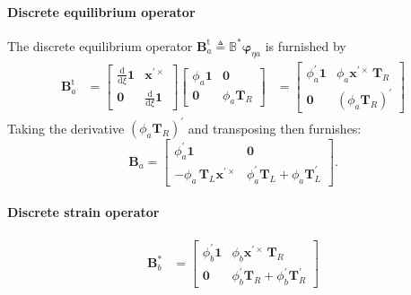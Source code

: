 \paragraph{Discrete equilibrium operator}
The discrete equilibrium operator \(\bm{B}_a^{\mathrm{t}} \triangleq \mathbb{B}^* \bm{\varphi}_{\eta a}\) is furnished by
\begin{equation*} 
   \begin{aligned}
   \bm{B}_a^{\mathrm{t}} &=\begin{bmatrix}
   \frac{\mathrm{d}}{\mathrm{d} \xi}\mathbf{1} & {\bm{x}^{\prime\times}} \\
   \mathbf{0} & \frac{\mathrm{d}}{\mathrm{d} \xi} \mathbf{1}
   \end{bmatrix}
   \begin{bmatrix}
   \phi_a \mathbf{1} & \mathbf{0} \\
   \mathbf{0} & \phi_a \mathbf{T}_{\scriptscriptstyle{R}}
   \end{bmatrix}
   &= \begin{bmatrix}
   \phi_a^\prime\mathbf{1} & \phi_a \bm{x}^{\prime\times} \,\mathbf{T}_{\scriptscriptstyle{R}} \\
   \mathbf{0} & \left(\phi_a \mathbf{T}_{\scriptscriptstyle{R}}\right)^{\prime}
   \end{bmatrix}
   \end{aligned}
\end{equation*}
Taking the derivative \(\left(\phi_a \mathbf{T}_{\scriptscriptstyle{R}}\right)^{\prime}\) and transposing then furnishes:
\begin{equation}
   \bm{B}_a = \begin{bmatrix}
   \phi_a^\prime\mathbf{1} & \mathbf{0} \\
   -\phi_a \,\mathbf{T}_{\scriptscriptstyle{L}} \bm{x}^{\prime\times} & \phi_a^\prime \mathbf{T}_{\scriptscriptstyle{L}}+ \phi_a\mathbf{T}_{\scriptscriptstyle{L}}^{\prime}
   \end{bmatrix}.
   \label{eq:Ba-ifk}
\end{equation}
 
\paragraph{Discrete strain operator} 
\begin{equation}
   \begin{aligned}
   \bm{B}_b^* %
   &= \begin{bmatrix}
   \phi_b^\prime\mathbf{1} & \phi_b \bm{x}^{\prime\times} \, \mathbf{T}_{\scriptscriptstyle{R}}  \\
   \mathbf{0} & \phi_b^{\prime} \mathbf{T}_{\scriptscriptstyle{R}} +  \phi_b^{\prime} \mathbf{T}_{\scriptscriptstyle{R}}^{\prime}
   \end{bmatrix}
   \end{aligned}
   \label{eq:Bb-ifk}
\end{equation}


